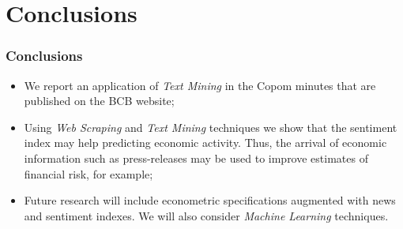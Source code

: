 \documentclass[aspectratio=169]{beamer}
\begin{document}

\section{Conclusions}

\begin{frame}\frametitle{Conclusions}
  \begin{itemize}
    \item We report an application of \emph{Text Mining} in the Copom minutes that are published on the BCB website;
    \item Using \emph{Web Scraping} and \emph{Text Mining} techniques we show that the sentiment index may help predicting economic activity. Thus, the arrival of economic information such as press-releases may be used to improve estimates of financial risk, for example;
\item Future research will include econometric specifications augmented with news and sentiment indexes. We will also consider \emph{Machine Learning} techniques. 
  \end{itemize}
\end{frame}
\end{document}
